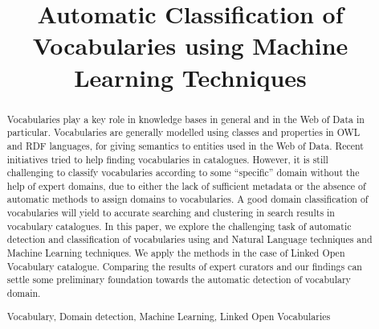 \documentclass[runningheads,a4paper]{llncs}
\newcommand{\keywords}[1]{\par\addvspace\baselineskip
\noindent\keywordname\enspace\ignorespaces#1}
\begin{document}
\title{Automatic Classification of Vocabularies using Machine Learning Techniques }






\maketitle


\begin{abstract}
Vocabularies play a key role in knowledge bases in general and in the Web of Data in particular. Vocabularies are generally modelled using classes and properties in OWL and RDF languages, for giving semantics to entities used in the Web of Data. Recent initiatives tried to help finding vocabularies in catalogues. However, it is still challenging to classify  vocabularies according to some ``specific'' domain without the help of expert domains, due to either the lack of sufficient metadata or the absence of automatic methods to assign domains to vocabularies.  A good domain classification of vocabularies will yield to accurate searching and clustering in search results in vocabulary catalogues. In this paper, we explore the challenging task of automatic detection and classification of vocabularies using and Natural Language techniques and Machine Learning techniques. We apply the methods in the case of Linked Open Vocabulary catalogue. Comparing the results of expert curators and our findings can settle some preliminary foundation towards the automatic detection of vocabulary domain. 

\keywords{Vocabulary, Domain detection, Machine Learning, Linked Open Vocabularies }
\end{abstract}
\end{document}
